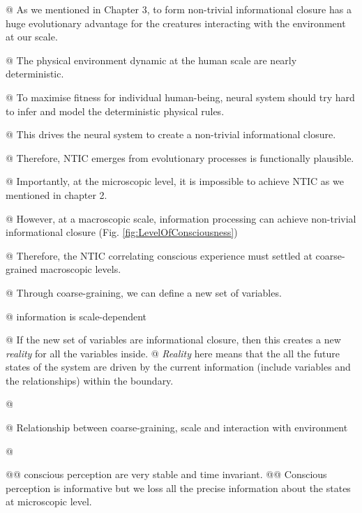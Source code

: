 		\begin{WritingMaterials}
		
        @ As we mentioned in Chapter 3, to form non-trivial informational closure has a huge evolutionary advantage for the creatures interacting with the environment at our scale. 
        
        @ The physical environment dynamic at the human scale are nearly deterministic.
        
		@ To maximise fitness for individual human-being, neural system should try hard to infer and model the deterministic physical rules.

		@ This drives the neural system to create a non-trivial informational closure.
		
        @ Therefore, NTIC emerges from evolutionary processes is functionally plausible. 
        
        @ Importantly, at the microscopic level, it is impossible to achieve NTIC as we mentioned in chapter 2.

		@ However, at a macroscopic scale, information processing can achieve non-trivial informational closure (Fig. \ref{fig:LevelOfConsciousness})
        
        @ Therefore, the NTIC correlating conscious experience must settled at coarse-grained macroscopic levels.
        
		@ Through coarse-graining, we can define a new set of variables.

        @ information is scale-dependent
        
		@ If the new set of variables are informational closure, then this creates a new \textit{reality} for all the variables inside.        
		@ \textit{Reality} here means that the all the future states of the system are driven by the current information (include variables and the relationships) within the boundary. 
			
        @
        
        @ Relationship between coarse-graining, scale and interaction with environment
        
        
		@  \cite{price2007causation}

			@@ conscious perception are very stable and time invariant.
			@@ Conscious perception is informative but we loss all the precise information about the states at microscopic level.        
        

\end{WritingMaterials}
